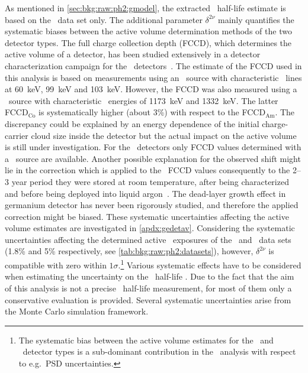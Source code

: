 As mentioned in \cref{sec:bkg:raw:ph2:gmodel}, the extracted \nnbb\ half-life estimate is
based on the \enrBEGeII\ data set only. The additional parameter $\delta^{2\nu}$ mainly
quantifies the systematic biases between the active volume determination methods of the
two detector types. The full charge collection depth (FCCD), which determines the active
volume of a detector, has been studied extensively in a detector characterization campaign for
the \bege\ detectors~\cite{Agostini2015e, Agostini2019}. The estimate of the FCCD used in
this analysis is based on measurements using an \Am\ source with characteristic \g\ lines
at 60~keV, 99~keV and 103~keV.  However, the FCCD was also measured using a \Co\ source
with characteristic \g\ energies of 1173~keV and 1332~keV. The latter FCCD$_\text{Co}$ is
systematically higher (about 3\%) with respect to the FCCD$_\text{Am}$. The discrepancy
could be explained by an energy dependence of the initial charge-carrier cloud size inside
the detector but the actual impact on the active volume is still under investigation. For
the \scoax\ detectors only FCCD values determined with a \Co\ source are available.
Another possible explanation for the observed shift might lie in the correction
which is applied to the \bege\ FCCD values consequently to the 2--3 year period they were
stored at room temperature, after being characterized and before being deployed into
liquid argon~\cite{Agostini2019}. The dead-layer growth effect in germanium detector has
never been rigorously studied, and therefore the applied correction might be biased. These
systematic uncertainties affecting the active volume estimates are investigated in
\cref{apdx:gedetav}.
Considering the systematic uncertainties affecting the determined active \gesix\ exposures
of the \enrBEGeII\ and \enrCoaxII\ data sets (1.8\% and 5\% respectively, see
\cref{tab:bkg:raw:ph2:datasets}), however, $\delta^{2\nu}$ is compatible with zero within
$1\sigma$.\footnote{%
  The systematic bias between the active volume estimates for the \bege\ and \scoax\
  detector types is a sub-dominant contribution in the \onbb\ analysis with respect to
  e.g.~PSD uncertainties.
}
\newpar
Various systematic effects have to be considered when estimating the uncertainty on the
\nnbb\ half-life \thalftwo. Due to the fact that the aim of this analysis is not a precise
\nnbb\ half-life measurement, for most of them only a conservative evaluation is provided.
Several systematic uncertainties arise from the Monte Carlo simulation framework.
